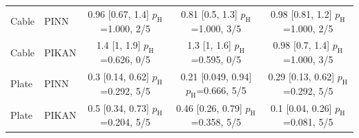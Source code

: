 \begin{tabular}{llccc}
Cable & PINN & \makecell{0.96 [0.67, 1.4]\\{\footnotesize $p_{\mathrm{H}}$=1.000, 2/5}} & \makecell{0.81 [0.5, 1.3]\\{\footnotesize $p_{\mathrm{H}}$=1.000, 3/5}} & \makecell{0.98 [0.81, 1.2]\\{\footnotesize $p_{\mathrm{H}}$=1.000, 2/5}}\\
Cable & PIKAN & \makecell{1.4 [1, 1.9]\\{\footnotesize $p_{\mathrm{H}}$=0.626, 0/5}} & \makecell{1.3 [1, 1.6]\\{\footnotesize $p_{\mathrm{H}}$=0.595, 0/5}} & \makecell{0.98 [0.7, 1.4]\\{\footnotesize $p_{\mathrm{H}}$=1.000, 3/5}}\\
Plate & PINN & \makecell{0.3 [0.14, 0.62]\\{\footnotesize $p_{\mathrm{H}}$=0.292, 5/5}} & \makecell{0.21 [0.049, 0.94]\\{\footnotesize $p_{\mathrm{H}}$=0.666, 5/5}} & \makecell{0.29 [0.13, 0.62]\\{\footnotesize $p_{\mathrm{H}}$=0.292, 5/5}}\\
Plate & PIKAN & \makecell{0.5 [0.34, 0.73]\\{\footnotesize $p_{\mathrm{H}}$=0.204, 5/5}} & \makecell{0.46 [0.26, 0.79]\\{\footnotesize $p_{\mathrm{H}}$=0.358, 5/5}} & \makecell{0.1 [0.04, 0.26]\\{\footnotesize $p_{\mathrm{H}}$=0.081, 5/5}}\\
\bottomrule
\end{tabular}
